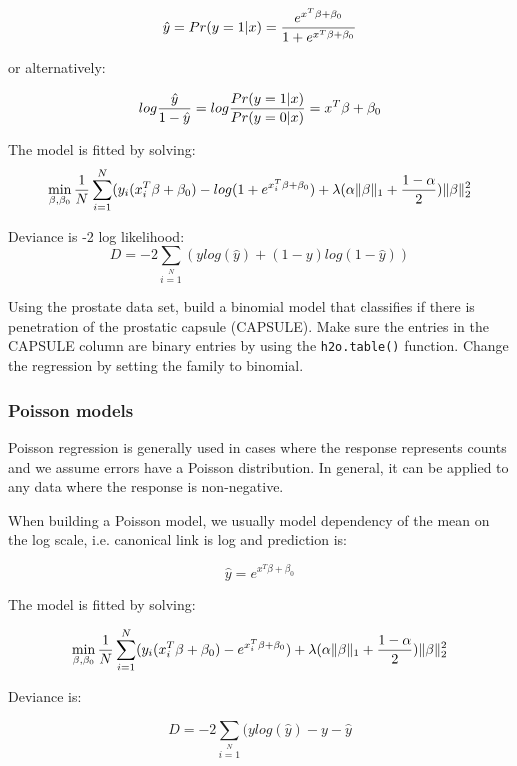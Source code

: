 \[ \hat{y} = Pr(y = 1|x) = {e^{x^T\beta + \beta_0} \over 1 + e^{x^T \beta + \beta_0} } \]

or alternatively:

\[log {\hat{y} \over 1- \hat{y}} = log{Pr(y=1|x) \over Pr(y=0|x)} = x^T \beta + \beta_0\]

The model is fitted by solving:
\[  \min\limits_{\beta,\beta_0} { {1 \over N}\sum\limits_{i=1}\limits^{N}(y_i (x_i^{T}\beta  + \beta_0) - log (1 + e^{x_i^{T}\beta  + \beta_0} )  + \lambda (\alpha \|\beta \|_1 + {1-\alpha \over 2}) \| \beta \|_2^2} \]

Deviance is -2 log likelihood:
\[D = -2\sum\limits_{i=1}\limits^{N}{(y log(\hat{y}) + (1 - y)log(1-\hat{y})  )}\]

\waterExampleInR

Using the prostate data set, build a binomial model that classifies if there is penetration of the prostatic
capsule (CAPSULE). Make sure the entries in the CAPSULE column are binary entries by using the \texttt{h2o.table()}
function. Change the regression by setting the family to binomial.



\waterExampleInPython


\subsubsection{Poisson models}
Poisson regression is generally used in cases where the response represents counts and we assume errors have a
Poisson distribution. In general, it can be applied to any data where the response is non-negative.

When building a Poisson model, we usually model dependency of the mean on the log scale, i.e. canonical link is log
and prediction is:

\[\hat{y} = e^{x^T\beta + \beta_0}\]

The model is fitted by solving:

\[  \min\limits_{\beta,\beta_0} { {1 \over N}\sum\limits_{i=1}\limits^{N}(y_i (x_i^{T}\beta  + \beta_0) - e^{x_i^{T}\beta  + \beta_0})  + \lambda (\alpha \|\beta \|_1 + {1-\alpha \over 2}) \| \beta \|_2^2} \]

Deviance is:

\[D = -2\sum\limits_{i=1}\limits^{N}{(y log(\hat{y}) - y - \hat{y}}\]

\waterExampleInR

